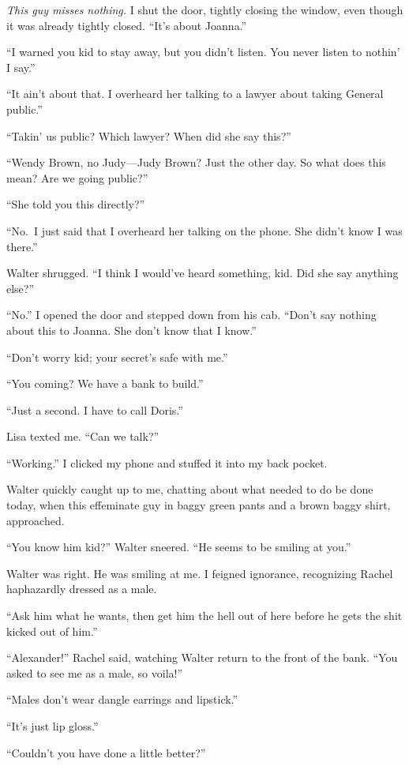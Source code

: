 \emph{This guy misses nothing.} I shut the door, tightly closing the
window, even though it was already tightly closed. ``It's about
Joanna.''

``I warned you kid to stay away, but you didn't listen. You never listen
to nothin' I say.''

``It ain't about that. I overheard her talking to a lawyer about taking
General public.''

``Takin' us public? Which lawyer? When did she say this?''

``Wendy Brown, no Judy---Judy Brown? Just the other day. So what does
this mean? Are we going public?''

``She told you this directly?''

``No.~I just said that I overheard her talking on the phone. She didn't
know I was there.''

Walter shrugged. ``I think I would've heard something, kid. Did she say
anything else?''

``No.'' I opened the door and stepped down from his cab. ``Don't say
nothing about this to Joanna. She don't know that I know.''

``Don't worry kid; your secret's safe with me.''

``You coming? We have a bank to build.''

``Just a second. I have to call Doris.''

Lisa texted me. ``Can we talk?''

``Working.'' I clicked my phone and stuffed it into my back pocket.

Walter quickly caught up to me, chatting about what needed to do be done
today, when this effeminate guy in baggy green pants and a brown baggy
shirt, approached.

``You know him kid?'' Walter sneered. ``He seems to be smiling at you.''

Walter was right. He was smiling at me. I feigned ignorance, recognizing
Rachel haphazardly dressed as a male.

``Ask him what he wants, then get him the hell out of here before he
gets the shit kicked out of him.''

``Alexander!'' Rachel said, watching Walter return to the front of the
bank. ``You asked to see me as a male, so voila!''

``Males don't wear dangle earrings and lipstick.''

``It's just lip gloss.''

``Couldn't you have done a little better?''

